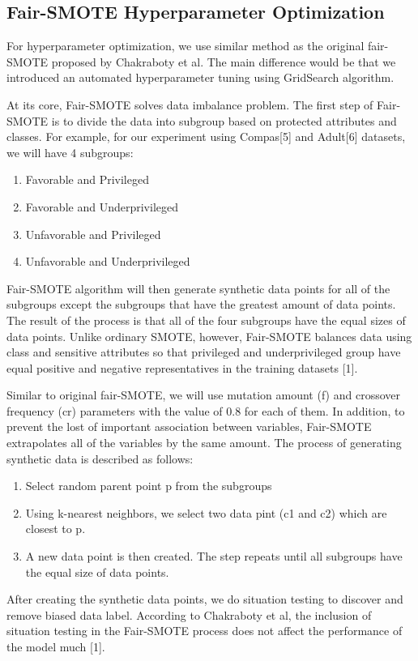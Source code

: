 \documentclass[sigconf]{acmart}
\begin{document}
\subsection{Fair-SMOTE Hyperparameter Optimization}
For hyperparameter optimization, we use similar method as the original fair-SMOTE proposed by Chakraboty et al. The main difference would be that we introduced an automated hyperparameter tuning using GridSearch algorithm. 

At its core, Fair-SMOTE solves data imbalance problem. The first step of Fair-SMOTE is to divide the data into subgroup based on protected attributes and classes. For example, for our experiment using Compas[5] and Adult[6] datasets, we will have 4 subgroups:
\begin{enumerate}
    \item Favorable and Privileged
    \item Favorable and Underprivileged
    \item  Unfavorable and Privileged
    \item Unfavorable and Underprivileged
\end{enumerate}
Fair-SMOTE algorithm will then generate synthetic data points for all of the subgroups except the subgroups that have the greatest amount of data points. The result of the process is that all of the four subgroups have the equal sizes of data points. Unlike ordinary SMOTE, however, Fair-SMOTE balances data using class and sensitive attributes so that privileged and underprivileged group have equal positive and negative representatives in the training datasets [1]. 

Similar to original fair-SMOTE, we will use mutation amount (f) and crossover frequency (cr) parameters with the value of 0.8 for each of them. In addition, to prevent the lost of important association between variables, Fair-SMOTE extrapolates all of the variables by the same amount. The process of generating synthetic data is described as follows:
\begin{enumerate}
    \item Select random parent point p from the subgroups
    \item Using k-nearest neighbors, we select two data pint (c1 and c2) which are closest to p.
    \item A new data point is then created. The step repeats until all subgroups have the equal size of data points. 
\end{enumerate}

After creating the synthetic data points, we do situation testing to discover and remove biased data label. According to Chakraboty et al, the inclusion of situation testing in the Fair-SMOTE process does not affect the performance of the model much [1].
\end{document}
